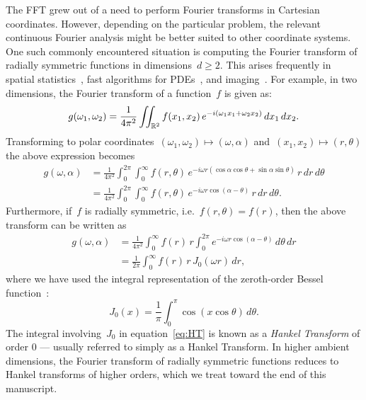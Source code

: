 The FFT grew out of a need to perform Fourier transforms in Cartesian
coordinates. However, depending on the particular problem, the relevant
continuous Fourier analysis might be better suited to other coordinate systems.
One such commonly encountered situation is computing the Fourier transform of
radially symmetric functions in dimensions~$d \geq 2$. This arises frequently in
spatial statistics~\cite{}, fast algorithms for PDEs~\cite{}, and
imaging~\cite{}. For example, in two dimensions, the Fourier transform of a
function~$f$ is given as:
\begin{equation}
  g(\omega_1, \omega_2) = \frac{1}{4\pi^2} \iint_{\mathbb{R}^2} f(x_1, x_2) \, 
  e^{-i(\omega_1 x_1 + \omega_2 x_2)}  \, dx_1 \, dx_2.
\end{equation}
Transforming to polar coordinates~$(\omega_1,\omega_2) \mapsto (\omega,\alpha)$
and~$(x_1,x_2) \mapsto (r,\theta)$ the above expression becomes
\begin{equation}
  \label{eq:ftpolar}
  \begin{aligned}
    g(\omega, \alpha) &= \frac{1}{4\pi^2} \int_0^{2\pi} \int_0^\infty
    f(r,\theta) \, 
    e^{-i \omega r (\cos\alpha \cos\theta + \sin\alpha \sin\theta) } 
    \, r \, dr \, d\theta \\
  &= \frac{1}{4\pi^2} \int_0^{2\pi} \int_0^\infty f(r,\theta) \, e^{-i \omega r \cos(\alpha-\theta) } \, r \, dr \, d\theta.
  \end{aligned}
\end{equation}
Furthermore, if~$f$ is radially symmetric, i.e.~$f(r, \theta) = f(r)$, then the
above transform can be written as
\begin{equation}
  \label{eq:HT}
  \begin{aligned}
  g(\omega,\alpha) &= \frac{1}{4\pi^2} \int_0^\infty f(r) \, r \int_0^{2\pi} 
  e^{-i \omega r \cos(\alpha - \theta) }  \, d\theta \, dr \\
  &= \frac{1}{2\pi} \int_0^\infty f(r) \, r \, J_0(\omega r)  \, dr,
  \end{aligned}
\end{equation}
where we have used the integral representation of the zeroth-order Bessel
function~\cite{olver2010nist}:
\begin{equation}
  J_0(x) 
  = \frac{1}{\pi} \int_0^\pi \cos \left( x \cos \theta \right) \, d\theta.
\end{equation}
The integral involving~$J_0$ in equation~\eqref{eq:HT} is known as a
\emph{Hankel Transform} of order 0 --- usually referred to simply as a Hankel
Transform. In higher ambient dimensions, the Fourier transform of radially
symmetric functions reduces to Hankel transforms of higher orders, which we
treat toward the end of this manuscript. 


